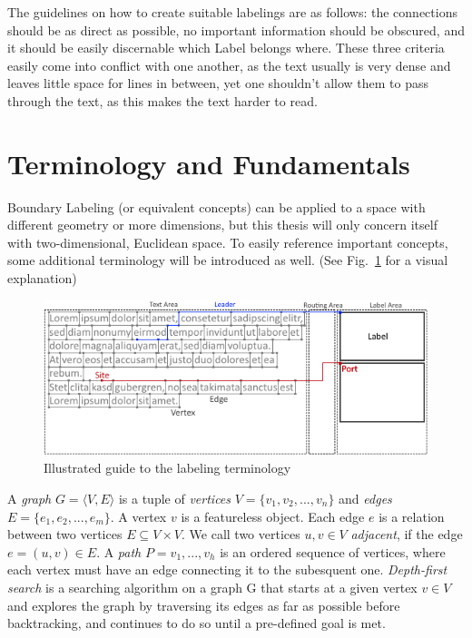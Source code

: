 \documentclass[11pt,a4paper]{vutinfth}
\begin{document}
The guidelines on how to create suitable labelings are as follows: the connections should be as direct as possible, no important information should be obscured, and it should be easily discernable which Label belongs where. These three criteria easily come into conflict with one another, as the text usually is very dense and leaves little space for lines in between, yet one shouldn't allow them to pass through the text, as this makes the text harder to read. 

\section{Terminology and Fundamentals} 
Boundary Labeling (or equivalent concepts) can be applied to a space with different geometry or more dimensions, but this thesis will only concern itself with two-dimensional, Euclidean space.
To easily reference important concepts, some additional terminology will be introduced as well. (See Fig.~\ref{fig:term} for a visual explanation)


\begin{figure}
 \captionsetup{justification=centering, margin=0.75cm}
 \centering
  \includegraphics[scale=0.95]{GraphTerminologyExtended.png}
  \caption{Illustrated guide to the labeling terminology}
 \label{fig:term}
\end{figure}

A \emph{graph} $G=\langle V, E \rangle$ is a tuple of \emph{vertices} $V=\{v_1, v_2, ..., v_n\}$ and \emph{edges} $E=\{e_1, e_2, ..., e_m\}$. A vertex $v$ is a featureless object. %
 Each edge $e$ is a relation between two vertices $E \subseteq V\times V$. %
We call two vertices $u,v \in V$ \emph{adjacent}, if the edge $e=(u,v) \in E$.
 A \emph{path} $P=v_1, ..., v_h$ is an ordered sequence of vertices, where each vertex must have an edge connecting it to the subesquent one.
 \emph{Depth-first search} is a searching algorithm on a graph G that starts at a given vertex $v \in V$ and explores the graph by traversing its edges as far as possible before backtracking, and continues to do so until a pre-defined goal is met. 
\end{document}
